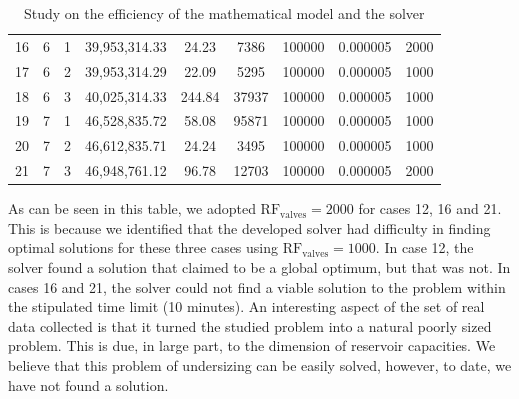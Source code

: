 \documentclass{singlecol}
\theoremstyle{TH}{
\newtheorem{lemma}{Lemma}
\newtheorem{theorem}[lemma]{Theorem}
\newtheorem{corrolary}[lemma]{Corrolary}
\newtheorem{conjecture}[lemma]{Conjecture}
\newtheorem{proposition}[lemma]{Proposition}
\newtheorem{claim}[lemma]{Claim}
\newtheorem{stheorem}[lemma]{Wrong Theorem}
\newtheorem{algorithm}{Algorithm}
}
\theoremstyle{THrm}{
\newtheorem{definition}{Definition}[section]
\newtheorem{question}{Question}[section]
\newtheorem{remark}{Remark}
\newtheorem{scheme}{Scheme}
}
\theoremstyle{THhit}{
\newtheorem{case}{Case}[section]
}
\begin{document}
\begin{table}[t]
\begin{center}
\begin{small}
\begin{tabular}{ c c c c c c c c c }
	 16  &  6 & 1  & 39,953,314.33  &   24.23   &   7386    &  100000   &    0.000005   & 2000 \\
	 17  &  6 & 2  & 39,953,314.29  &   22.09   &   5295    &  100000   &    0.000005   & 1000 \\
	 18  &  6 & 3  & 40,025,314.33  &  244.84   &  37937    &  100000   &    0.000005   & 1000 \\
	 19  &  7 & 1  & 46,528,835.72  &   58.08   &  95871    &  100000   &    0.000005   & 1000 \\
	 20  &  7 & 2  & 46,612,835.71  &   24.24   &   3495    &  100000   &    0.000005   & 1000 \\
	 21  &  7 & 3  & 46,948,761.12  &   96.78   &  12703    &  100000   &    0.000005   & 2000 \\
	
	\end{tabular}
\caption{Study on the efficiency of the mathematical model and the solver}
\label{tab:lingoEvaluation}
\end{small}
\end{center}
\end{table}

As can be seen in this table, we adopted $\mathrm{RF_{valves}} = 2000$ for cases 12, 16 and 21. This is because we identified that the developed solver had difficulty in finding optimal solutions for these three cases using $\mathrm {RF_{valves}} = 1000$. In case 12, the solver found a solution that claimed to be a global optimum, but that was not. In cases 16 and 21, the solver could not find a viable solution to the problem within the stipulated time limit (10 minutes). An interesting aspect of the set of real data collected is that it turned the studied problem into a natural poorly sized problem. This is due, in large part, to the dimension of reservoir capacities. We believe that this problem of undersizing can be easily solved, however, to date, we have not found a solution. 
\end{document}
